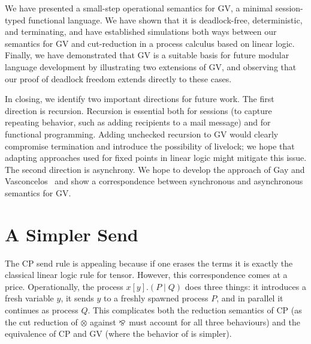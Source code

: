 \documentclass[oribibl,orivec,envcountsame]{llncs}
\begin{document}
We have presented a small-step operational semantics for GV, a minimal session-typed functional
language. We have shown that it is deadlock-free, deterministic, and terminating, and have
established simulations both ways between our semantics for GV and cut-reduction in a process
calculus based on linear logic. Finally, we have demonstrated that GV is a suitable basis for future
modular language development by illustrating two extensions of GV, and observing that our proof of
deadlock freedom extends directly to these cases.

In closing, we identify two important directions for future work. The first direction is
recursion. Recursion is essential both for sessions (to capture repeating behavior, such as adding
recipients to a mail message) and for functional programming. Adding unchecked recursion to GV would
clearly compromise termination and introduce the possibility of livelock; we hope that adapting
approaches used for fixed points in linear logic might mitigate this issue. The second direction is
asynchrony. We hope to develop the approach of Gay and Vasconcelos~\cite{GayVasconcelos10} and show
a correspondence between synchronous and asynchronous semantics for GV.

\small
\label{sec:bib}


\normalsize

\appendix

\section{A Simpler Send}\label{sec:send}

The CP send rule is appealing because if one erases the terms it is exactly the classical linear
logic rule for tensor. However, this correspondence comes at a price. Operationally, the process
$x[y].(P \mid Q)$ does three things: it introduces a fresh variable $y$, it sends $y$ to a freshly
spawned process $P$, and in parallel it continues as process $Q$.  This complicates both the
reduction semantics of CP (as the cut reduction of $\otimes$ against $\mathbin\bindnasrepma$ must account for all
three behaviours) and the equivalence of CP and GV (where the behavior of  is simpler).
\end{document}
